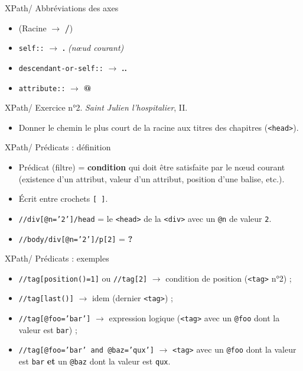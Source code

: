 \documentclass{beamer}
\begin{document}
    \begin{frame}{XPath/ Abbréviations des axes}
    \Large
        \begin{itemize}
            \item (Racine $\rightarrow$ \textbf{/})
            \item \texttt{self::} $\rightarrow$ \textbf{.} \textit{(n\oe ud courant)}
            \item \texttt{descendant-or-self::} $\rightarrow$ \textbf{..}
            \item \texttt{attribute::} $\rightarrow$ \textbf{@}
        \end{itemize}
    \end{frame}

    \begin{frame}{XPath/ Exercice n°2. \textit{Saint Julien l'hospitalier}, II.}
        \Large
        \begin{itemize}
            \item Donner le chemin le plus court de la racine aux titres des chapitres (\texttt{<head>}).
        \end{itemize}
    \end{frame}

    \begin{frame}{XPath/ Prédicats : définition}
        \Large
        \begin{itemize}
            \item Prédicat (filtre) = \textbf{condition} qui doit être satisfaite par le n\oe ud courant (existence d'un attribut, valeur d'un attribut, position d'une balise, etc.).
            \item Écrit entre crochets \texttt{[ ]}.
            \bigskip
            \item \texttt{//div[@n='2']/head} = le \texttt{<head>} de la \texttt{<div>} avec un \texttt{@n} de valeur \texttt{2}.
            \bigskip
            \item \texttt{//body/div[@n='2']/p[2]} = \textbf{?}
        \end{itemize}
    \end{frame}

    \begin{frame}{XPath/ Prédicats : exemples}
        \Large
        \begin{itemize}
            \item \texttt{//tag[position()=1]} ou \texttt{//tag[2]} $\rightarrow$ condition de position (\texttt{<tag>} n°2) ;
            \bigskip
            \item \texttt{//tag[last()]} $\rightarrow$ idem (dernier \texttt{<tag>}) ;
            \bigskip
            \item \texttt{//tag[@foo='bar']} $\rightarrow$ expression logique (\texttt{<tag>} avec un \texttt{@foo} dont la valeur est \texttt{bar}) ;
            \bigskip
            \item \texttt{//tag[@foo='bar' and @baz='qux']} $\rightarrow$ \texttt{<tag>} avec un \texttt{@foo} dont la valeur est \texttt{bar} \textbf{et} un \texttt{@baz} dont la valeur est \texttt{qux}.
        \end{itemize}
    \end{frame}
\end{document}
